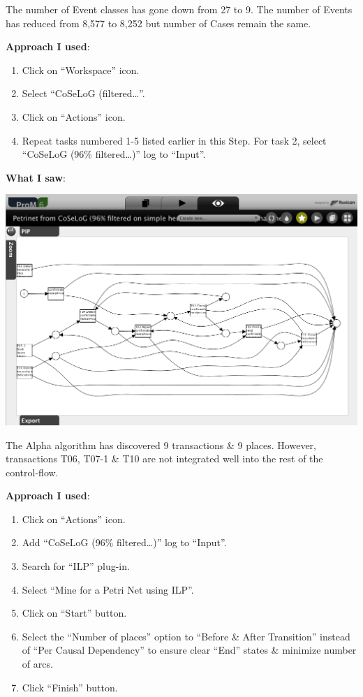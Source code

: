 \documentclass[]{article}
\begin{document}
The number of Event classes has gone down from 27 to 9. The number of
Events has reduced from 8,577 to 8,252 but number of Cases remain the
same.

\textbf{Approach I used}:

\begin{enumerate}
\def\labelenumi{\arabic{enumi}.}
\setcounter{enumi}{18}
\itemsep1pt\parskip0pt
\item
  Click on ``Workspace'' icon.
\item
  Select ``CoSeLoG (filtered\ldots{}''.\\
\item
  Click on ``Actions'' icon.\\
\item
  Repeat tasks numbered 1-5 listed earlier in this Step. For task 2,
  select ``CoSeLoG (96\% filtered\ldots{})'' log to ``Input''.
\end{enumerate}

\textbf{What I saw}:

\includegraphics{CoSeLoG_Step_05_Filter96_PetriNet_Alpha.png}

The Alpha algorithm has discovered 9 transactions \& 9 places. However,
transactions T06, T07-1 \& T10 are not integrated well into the rest of
the control-flow.

\textbf{Approach I used}:

\begin{enumerate}
\def\labelenumi{\arabic{enumi}.}
\setcounter{enumi}{22}
\itemsep1pt\parskip0pt
\item
  Click on ``Actions'' icon.\\
\item
  Add ``CoSeLoG (96\% filtered\ldots{})'' log to ``Input''.\\
\item
  Search for ``ILP'' plug-in.\\
\item
  Select ``Mine for a Petri Net using ILP''.
\item
  Click on ``Start'' button.
\item
  Select the ``Number of places'' option to ``Before \& After
  Transition'' instead of ``Per Causal Dependency'' to ensure clear
  ``End'' states \& minimize number of arcs.
\item
  Click ``Finish'' button.
\end{enumerate}
\end{document}
